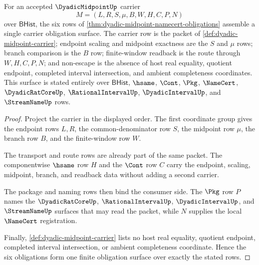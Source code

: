\begin{theorem}\label{thm:dyadicmidpoint-carrier-obligation-surface}
For an accepted $\DyadicMidpointUp$ carrier
$$
M=(L,R,S,\mu,B,W,H,C,P,N)
$$
over $\mathsf{BHist}$, the six rows of \autoref{thm:dyadic-midpoint-namecert-obligations} assemble a single carrier obligation surface. The carrier row is the packet of \autoref{def:dyadic-midpoint-carrier}; endpoint scaling and midpoint exactness are the $S$ and $\mu$ rows; branch comparison is the $B$ row; finite-window readback is the route through $W,H,C,P,N$; and non-escape is the absence of host real equality, quotient endpoint, completed interval intersection, and ambient completeness coordinates. This surface is stated entirely over $\mathsf{BHist}$, $\hsame$, $\Cont$, $\Pkg$, $\NameCert$, $\DyadicRatCoreUp$, $\RationalIntervalUp$, $\DyadicIntervalUp$, and $\StreamNameUp$ rows.
\end{theorem}
\begin{proof}
Project the carrier in the displayed order. The first coordinate group gives the endpoint rows $L,R$, the common-denominator row $S$, the midpoint row $\mu$, the branch row $B$, and the finite-window row $W$.

The transport and route rows are already part of the same packet. The componentwise $\hsame$ row $H$ and the $\Cont$ row $C$ carry the endpoint, scaling, midpoint, branch, and readback data without adding a second carrier.

The package and naming rows then bind the consumer side. The $\Pkg$ row $P$ names the $\DyadicRatCoreUp$, $\RationalIntervalUp$, $\DyadicIntervalUp$, and $\StreamNameUp$ surfaces that may read the packet, while $N$ supplies the local $\NameCert$ registration.

Finally, \autoref{def:dyadic-midpoint-carrier} lists no host real equality, quotient endpoint, completed interval intersection, or ambient completeness coordinate. Hence the six obligations form one finite obligation surface over exactly the stated rows.
\end{proof}

